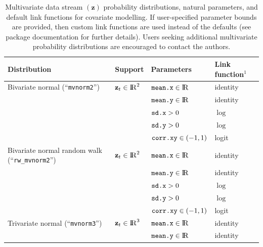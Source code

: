 \documentclass[12pt]{article}\usepackage[]{graphicx}\usepackage[]{xcolor}
\begin{document}
\begin{small}
\begin{table}
  \caption{\label{tab:multipdfs} Multivariate data stream $({\mathbf z})$ probability distributions, natural parameters, and default link functions for covariate modelling. If user-specified parameter bounds are provided, then custom link functions are used instead of the defaults (see package documentation for further details). Users seeking additional multivariate probability distributions are encouraged to contact the authors.}
  \begin{tabular}{llll}
  \toprule
  Distribution                                          & Support                         & Parameters                       & Link function$^1$ \tabularnewline
  \midrule
  \rowcolor{Gray} Bivariate normal (``\verb|mvnorm2|'') & ${\mathbf z_t}\in{\rm I\!R}^2$  & $\verb|mean.x|\in{\rm I\!R}$     &  identity \tabularnewline  
  \rowcolor{Gray}                                       &                                 & $\verb|mean.y|\in{\rm I\!R}$     &  identity \tabularnewline  
  \rowcolor{Gray}                                       &                                 & $\verb|sd.x|>0$               &  $\log$ \tabularnewline          
  \rowcolor{Gray}                                       &                                 & $\verb|sd.y|>0$               &  $\log$ \tabularnewline  
  \rowcolor{Gray}                                       &                                 & $\verb|corr.xy|\in(-1,1)$   &  logit \tabularnewline                                              
  Bivariate normal random walk (``\verb|rw_mvnorm2|'')  & ${\mathbf z_t}\in{\rm I\!R}^2$  & $\verb|mean.x|\in{\rm I\!R}$     &  identity \tabularnewline  
                                                        &                                 & $\verb|mean.y|\in{\rm I\!R}$     &  identity \tabularnewline  
                                                        &                                 & $\verb|sd.x|>0$               &  $\log$ \tabularnewline                                                                                                                                               &                                 & $\verb|sd.y|>0$               &  $\log$ \tabularnewline
                                                        &                                 & $\verb|corr.xy|\in(-1,1)$   &  logit \tabularnewline    
  \rowcolor{Gray} Trivariate normal (``\verb|mvnorm3|'')& ${\mathbf z_t}\in{\rm I\!R}^3$  & $\verb|mean.x|\in{\rm I\!R}$     &  identity \tabularnewline  
  \rowcolor{Gray}                                       &                                 & $\verb|mean.y|\in{\rm I\!R}$     &  identity \tabularnewline  

\end{tabular}
\end{table}
\end{small}
\end{document}
